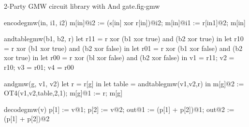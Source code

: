 \begin{fpfig}[t]{2-Party GMW circuit library with And gate.}{fig-gmw}
{\footnotesize
  \begin{verbatimtab}
    encodegmw(in, i1, i2) {
      m[in]@i2 := (s[in] xor r[in])@i2;
      m[in]@i1 := r[in1]@2;
      m[in]
    }
    
    andtablegmw(b1, b2, r) {
      let r11 = r xor (b1 xor true) and (b2 xor true) in
      let r10 = r xor (b1 xor true) and (b2 xor false) in
      let r01 = r xor (b1 xor false) and (b2 xor true) in
      let r00 = r xor (bl xor false) and (b2 xor false) in
      { v1 = r11; v2 = r10; v3 = r01; v4 = r00 }
    }
    
    andgmw(g, v1, v2) {
      let r = r[g] in
      let table = andtablegmw(v1,v2,r) in
      m[g]@2 := OT4(v1,v2,table,2,1);
      m[g]@1 := r;
      m[g]
    }
    
    decodegmw(v) {
      p[1] := v@1; p[2] := v@2;
      out@1 := (p[1] + p[2])@1;
      out@2 :=(p[1] + p[2])@2
    }
  \end{verbatimtab}
}
\end{fpfig}
